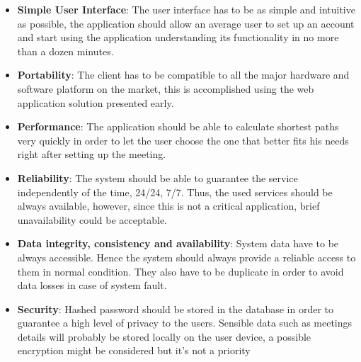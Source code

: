 \begin{itemize}
\item \textbf{Simple User Interface}:
The user interface has to be as simple and intuitive as possible, the application should allow an average user to set up an account and start using the application understanding its functionality in no more than a dozen minutes.

\item \textbf{Portability}: The client has to be compatible to all the major hardware and software platform on the market, this is accomplished using the web application solution presented early.

\item \textbf{Performance}: The application should be able to calculate shortest paths very quickly in order to let the user choose the one that better fits his needs right after setting up the meeting.

\item \textbf{Reliability}: The system should be able to guarantee the service independently of the time, 24/24, 7/7. Thus, the used services should be always available, however, since this is not a critical application, brief unavailability could be acceptable.

\item \textbf{Data integrity, consistency and availability}: System data have to be always accessible. Hence the system should always provide a reliable access to them in normal condition. They also have to be duplicate in order to avoid data losses in case of system fault. 

\item \textbf{Security}: Hashed password should be stored in the database in order to guarantee a high level of privacy to the users. Sensible data such as meetings details will probably be stored locally on the user device, a possible encryption might be considered but it's not a priority
\end{itemize}